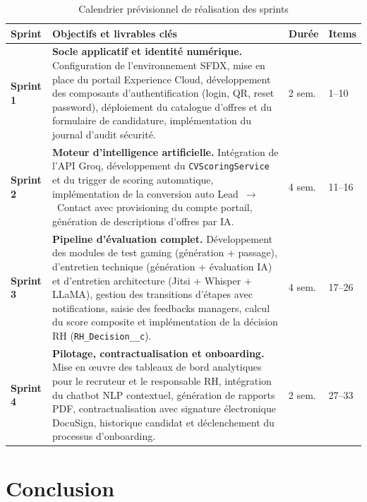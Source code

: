 \begin{table}[hbt!]
\centering
\renewcommand{\arraystretch}{1.4}
\begin{tabular}{|l|p{9.5cm}|l|l|}
\hline
\rowcolor{gray!15} \textbf{Sprint} & \textbf{Objectifs et livrables clés} & \textbf{Durée} & \textbf{Items} \\ \hline

\textbf{Sprint 1} & \textbf{Socle applicatif et identité numérique.} Configuration de l'environnement SFDX, mise en place du portail Experience Cloud, développement des composants d'authentification (login, QR, reset password), déploiement du catalogue d'offres et du formulaire de candidature, implémentation du journal d'audit sécurité. & 2 sem. & 1--10 \\ \hline

\textbf{Sprint 2} & \textbf{Moteur d'intelligence artificielle.} Intégration de l'API Groq, développement du \texttt{CVScoringService} et du trigger de scoring automatique, implémentation de la conversion auto Lead~$\rightarrow$~Contact avec provisioning du compte portail, génération de descriptions d'offres par IA. & 4 sem. & 11--16 \\ \hline

\textbf{Sprint 3} & \textbf{Pipeline d'évaluation complet.} Développement des modules de test gaming (génération + passage), d'entretien technique (génération + évaluation IA) et d'entretien architecture (Jitsi + Whisper + LLaMA), gestion des transitions d'étapes avec notifications, saisie des feedbacks managers, calcul du score composite et implémentation de la décision RH (\texttt{RH\_Decision\_\_c}). & 4 sem. & 17--26 \\ \hline

\textbf{Sprint 4} & \textbf{Pilotage, contractualisation et onboarding.} Mise en \oe{}uvre des tableaux de bord analytiques pour le recruteur et le responsable RH, intégration du chatbot NLP contextuel, génération de rapports PDF, contractualisation avec signature électronique DocuSign, historique candidat et déclenchement du processus d'onboarding. & 2 sem. & 27--33 \\ \hline
\end{tabular}
\caption{Calendrier prévisionnel de réalisation des sprints}
\label{tab:sprints_planification}
\end{table}

\FloatBarrier

\section{Conclusion}

